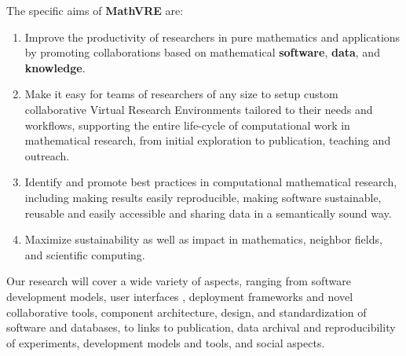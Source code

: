 \documentclass[a4paper,11pt]{article}
\newcommand{\XX}{\textbf{MathVRE}\xspace}
\newcommand{\TheProject}{\XX}
\begin{document}
The specific aims of \TheProject are:


\begin{enumerate}
\item \label{aim:collaboration} Improve the productivity of
  researchers in pure mathematics and applications by promoting
  collaborations based on mathematical \textbf{software},
  \textbf{data}, and \textbf{knowledge}.
\item \label{aim:vre} Make it easy for teams of
  researchers of any size to setup custom collaborative Virtual Research
  Environments tailored to their needs and workflows, supporting the
  entire life-cycle of computational work in mathematical research,
  from initial exploration to publication, teaching and outreach.
\item \label{aim:sharing} Identify and promote best practices in
  computational mathematical research, including making results easily
  reproducible, making software sustainable, reusable and easily
  accessible and sharing data in a semantically sound way.
\item \label{aim:impact} Maximize sustainability as well as impact in
  mathematics, neighbor fields, and scientific computing.
\end{enumerate}



Our research will cover a wide variety of aspects, ranging from
software development models, user interfaces , deployment frameworks and novel collaborative tools,
component architecture, design, and standardization of software
 and databases, to links to publication, data archival
and reproducibility of experiments, development models and tools, and
social aspects.
\end{document}
